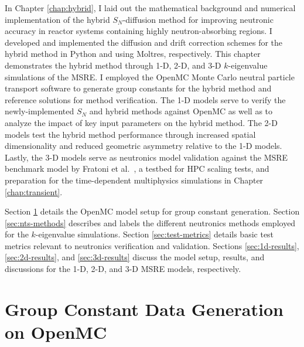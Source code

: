 In Chapter \ref{chap:hybrid}, I laid out the mathematical background and numerical implementation
of the hybrid $S_N$-diffusion method for improving neutronic accuracy in reactor systems containing
highly neutron-absorbing regions. I developed and implemented the diffusion and drift correction
schemes for the hybrid method in Python and using Moltres, respectively. This chapter demonstrates
the hybrid method through 1-D, 2-D, and 3-D $k$-eigenvalue simulations of the \gls{MSRE}.
I employed the OpenMC Monte Carlo neutral particle transport software \cite{romano_openmc:_2015} to
generate group constants for the hybrid method and reference solutions for method verification.
The 1-D models serve to verify the newly-implemented $S_N$ and hybrid methods
against OpenMC as well as to analyze the impact of key input parameters on the hybrid method. The
2-D models test the hybrid method performance through increased spatial dimensionality and reduced
geometric asymmetry relative to the 1-D models. Lastly, the 3-D models serve as neutronics model
validation against the \gls{MSRE} benchmark model by Fratoni et al.\ \cite{fratoni_molten_2020}, a
testbed for \gls{HPC} scaling tests, and preparation for the time-dependent multiphysics
simulations in Chapter \ref{chap:transient}.

Section \ref{sec:msre-gc} details the OpenMC model setup for group constant generation. Section
\ref{sec:nts-methods} describes and labels the different neutronics methods employed for the
$k$-eigenvalue simulations. Section \ref{sec:test-metrics} details basic test metrics relevant to
neutronics verification and validation. Sections \ref{sec:1d-results}, \ref{sec:2d-results}, and
\ref{sec:3d-results} discuss the model setup, results, and discussions for the 1-D, 2-D, and 3-D
\gls{MSRE} models, respectively.

\section{Group Constant Data Generation on OpenMC} \label{sec:msre-gc}

